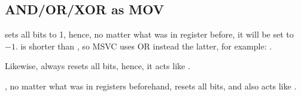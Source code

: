 \subsection{AND/OR/XOR as MOV}

 sets all bits to 1, hence, no matter what was in register before, it will be set to $-1$.
 is shorter than , so MSVC uses OR instead the latter,
for example: .

Likewise,  always resets all bits, hence, it acts like .

, no matter what was in registers beforehand, resets all bits, and also acts like .

